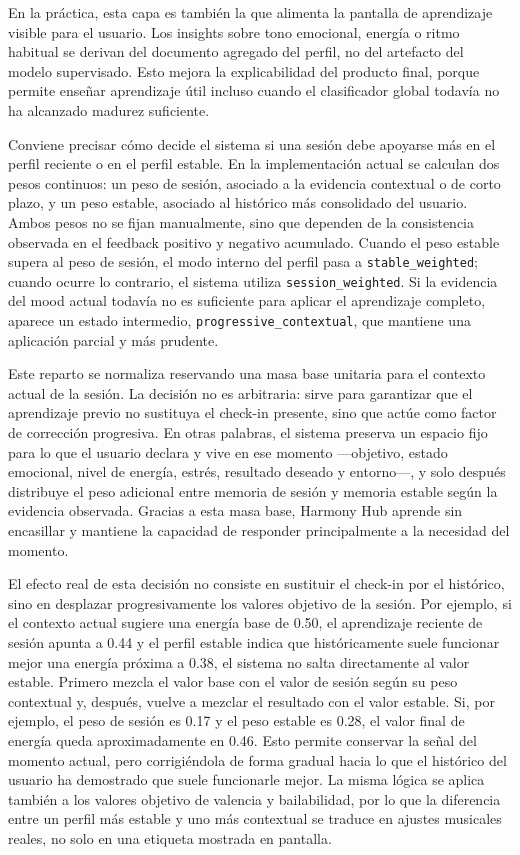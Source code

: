 En la práctica, esta capa es también la que alimenta la pantalla de aprendizaje
visible para el usuario. Los insights sobre tono emocional, energía o
ritmo habitual se derivan del documento agregado del perfil, no del artefacto
del modelo supervisado. Esto mejora la explicabilidad del producto final,
porque permite enseñar aprendizaje útil incluso cuando el clasificador global
todavía no ha alcanzado madurez suficiente.

Conviene precisar cómo decide el sistema si una sesión debe apoyarse más en el
perfil reciente o en el perfil estable. En la implementación actual se calculan
dos pesos continuos: un peso de sesión, asociado a la evidencia contextual o
de corto plazo, y un peso estable, asociado al histórico más consolidado del
usuario. Ambos pesos no se fijan manualmente, sino que dependen de la
consistencia observada en el feedback positivo y negativo acumulado. Cuando el
peso estable supera al peso de sesión, el modo interno del perfil pasa a
\texttt{stable\_weighted}; cuando ocurre lo contrario, el sistema utiliza
\texttt{session\_weighted}. Si la evidencia del mood actual todavía no es
suficiente para aplicar el aprendizaje completo, aparece un estado intermedio,
\texttt{progressive\_contextual}, que mantiene una aplicación parcial y más
prudente.

Este reparto se normaliza reservando una masa base unitaria para el contexto
actual de la sesión. La decisión no es arbitraria: sirve para garantizar que
el aprendizaje previo no sustituya el check-in presente, sino que actúe como
factor de corrección progresiva. En otras palabras, el sistema preserva un
espacio fijo para lo que el usuario declara y vive en ese momento —objetivo,
estado emocional, nivel de energía, estrés, resultado deseado y entorno—, y
solo después distribuye el peso adicional entre memoria de sesión y memoria
estable según la evidencia observada. Gracias a esta masa base, Harmony Hub
aprende sin encasillar y mantiene la capacidad de responder principalmente a la
necesidad del momento.

El efecto real de esta decisión no consiste en sustituir el check-in por el
histórico, sino en desplazar progresivamente los valores objetivo de la
sesión. Por ejemplo, si el contexto actual sugiere una energía base de 0.50,
el aprendizaje reciente de sesión apunta a 0.44 y el perfil estable indica que
históricamente suele funcionar mejor una energía próxima a 0.38, el sistema no
salta directamente al valor estable. Primero mezcla el valor base con el valor
de sesión según su peso contextual y, después, vuelve a mezclar el resultado
con el valor estable. Si, por ejemplo, el peso de sesión es 0.17 y el peso
estable es 0.28, el valor final de energía queda aproximadamente en 0.46. Esto
permite conservar la señal del momento actual, pero corrigiéndola de forma
gradual hacia lo que el histórico del usuario ha demostrado que suele
funcionarle mejor. La misma lógica se aplica también a los valores objetivo de
valencia y bailabilidad, por lo que la diferencia entre un perfil más estable y
uno más contextual se traduce en ajustes musicales reales, no solo en una
etiqueta mostrada en pantalla.

